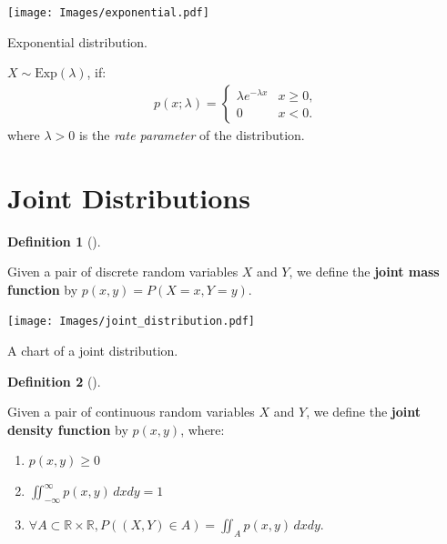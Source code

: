 \documentclass[
  letterpaper,
  12pt,
  british]{tufte-book}
\theoremstyle{plain}
\theoremstyle{definition}
\newtheorem{definition}{Definition}[chapter]
\theoremstyle{plain}
\theoremstyle{remark}
\begin{document}
\begin{marginfigure}

{\centering \texttt{[image: Images/exponential.pdf]}

}

\caption{\label{fig-exponential_distribution}Exponential distribution.}

\end{marginfigure}

\(\mathit{X}\sim \text{Exp}(\lambda)\), if: \begin{align}
    p(\mathit{x};\lambda) =
    \begin{cases}
        \lambda e^{-\lambda \mathit{x}} & \mathit{x}\ge 0, \\
        0 & \mathit{x}< 0.
    \end{cases}
\end{align} where \(\lambda > 0\) is the \emph{rate parameter} of the
distribution.

\hypertarget{joint-distributions}{%
\section{Joint Distributions}\label{joint-distributions}}

\leavevmode{}%
\begin{definition}[]\label{def-joint_mass_distribution}

Given a pair of discrete random variables \(\mathit{X}\) and
\(\mathit{Y}\), we define the \textbf{joint mass function} by
\(p(\mathit{x}, \mathit{y})=P(\mathit{X}=\mathit{x},\mathit{Y}=\mathit{y})\).

\end{definition}

\begin{marginfigure}

{\centering \texttt{[image: Images/joint\_distribution.pdf]}

}

\caption{\label{fig-joint_distribution}A chart of a joint distribution.}

\end{marginfigure}

\leavevmode{}%
\begin{definition}[]\label{def-joint_density_distribution}

Given a pair of continuous random variables \(\mathit{X}\) and
\(\mathit{Y}\), we define the \textbf{joint density function} by
\(p(\mathit{x}, \mathit{y})\), where:

\begin{enumerate}
\def\labelenumi{\roman{enumi}.}
\item
  \(p(\mathit{x}, \mathit{y}) \geq 0\)
\item
  \(\iint_{-\infty}^{\infty} p(\mathit{x},\mathit{y}) \, d\mathit{x}d\mathit{y}=1\)
\item
  \(\forall A \subset \mathbb{R}\times \mathbb{R}, P((\mathit{X},\mathit{Y})\in A)=\iint_{A}p(\mathit{x},\mathit{y})\, d\mathit{x}d\mathit{y}\).
\end{enumerate}

\end{definition}
\end{document}
